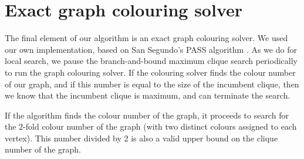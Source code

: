 \documentclass[a4paper,UKenglish,cleveref, autoref]{lipics-v2019}
\begin{document}
\section{Exact graph colouring solver}

The final element of our algorithm is an exact graph colouring solver.  We used our own implementation, based on San Segundo's PASS algorithm \cite{DBLP:journals/cor/Segundo12}.  As we do for local search, we pause the branch-and-bound maximum clique search periodically to run the graph colouring solver.  If the colouring solver finds the colour number of our graph, and if this number is equal to the size of the incumbent clique, then we know that the incumbent clique is maximum, and can terminate the search.

If the algorithm finds the colour number of the graph, it proceeds to search for the 2-fold colour number of the graph (with two distinct colours assigned to each vertex).  This number divided by 2 is also a valid upper bound on the clique number of the graph.
\end{document}
